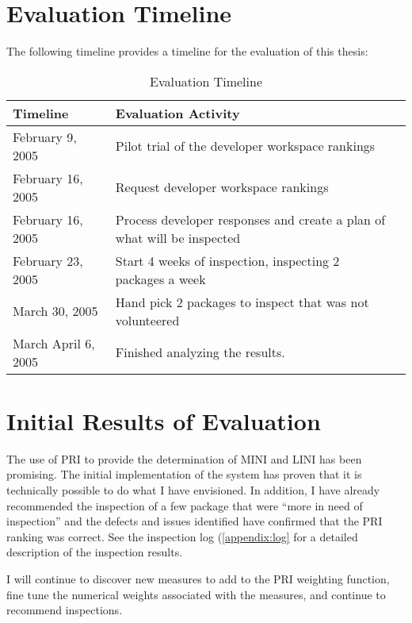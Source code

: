 \section{Evaluation Timeline}
The following timeline  provides a timeline for the evaluation of this thesis:
\begin{table}[htbp]
  \begin{center}
    \label{tab:eval-timeline}
    \caption{Evaluation Timeline}
    \begin{tabular}{|l|l|l|} \hline
      {\bf Timeline} & {\bf Evaluation Activity} \\ \hline
February 9, 2005 & Pilot trial of the developer workspace rankings \\ \hline
February 16, 2005 & Request developer workspace rankings \\ \hline
February 16, 2005 & Process developer responses and create a plan of what
will be inspected \\ \hline
February 23, 2005 & Start 4 weeks of inspection, inspecting 2 packages a
week \\ \hline
March 30, 2005 & Hand pick 2 packages to inspect that was not
volunteered \\ \hline
March April 6, 2005 & Finished analyzing the results.  \\ \hline
    \end{tabular}
  \end{center}
\end{table}


\section{Initial Results of Evaluation}
\label{sec:intialresults}
The use of PRI to provide the determination of MINI and LINI has been
promising. The initial implementation of the system has proven that it is
technically possible to do what I have envisioned. In addition, I have
already recommended the inspection of a few package that were ``more in
need of inspection'' and the defects and issues identified have confirmed
that the PRI ranking was correct. See the inspection log
(\ref{appendix:log} for a detailed description of the inspection results.

I will continue to discover new measures to add to the PRI weighting
function, fine tune the numerical weights associated with the measures, and
continue to recommend inspections.
















